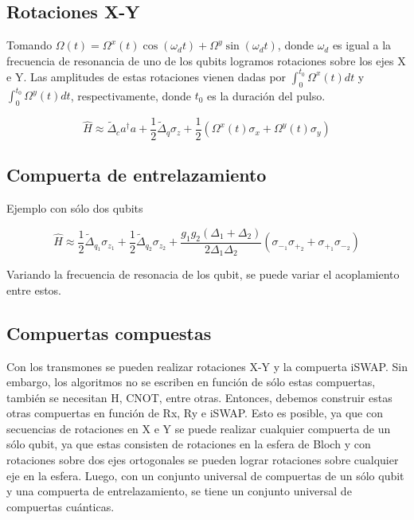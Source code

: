 \subsection{Rotaciones X-Y}

Tomando $\Omega(t) = \Omega^x(t) \cos(\omega_d t) + \Omega^y \sin(\omega_d t)$, donde $\omega_d$ es igual a la frecuencia de resonancia de uno de los qubits logramos rotaciones sobre los ejes X e Y. Las amplitudes de estas rotaciones vienen dadas por $\int_0^{t_0} \Omega^x(t) dt$ y $\int_0^{t_0} \Omega^y(t) dt$, respectivamente, donde $t_0$ es la duración del pulso.

$$\hat{H} \approx \tilde{\Delta}_c a^\dagger a + \frac{1}{2} \tilde{\Delta}_q \sigma_z + \frac{1}{2} (\Omega^x(t) \sigma_x + \Omega^y(t) \sigma_y)$$

\subsection{Compuerta de entrelazamiento}

Ejemplo con sólo dos qubits

$$\hat{H} \approx \frac{1}{2} \tilde{\Delta}_{q_1} \sigma_{z_1} + \frac{1}{2} \tilde{\Delta}_{q_2} \sigma_{z_2} + \frac{g_1 g_2 (\Delta_1 + \Delta_2)}{2 \Delta_1 \Delta_2} (\sigma_{-_1} \sigma_{+_2} + \sigma_{+_1} \sigma_{-_2})$$

Variando la frecuencia de resonacia de los qubit, se puede variar el acoplamiento entre estos. 

\subsection{Compuertas compuestas}

Con los transmones se pueden realizar rotaciones X-Y y la compuerta iSWAP. Sin embargo, los algoritmos no se escriben en función de sólo estas compuertas, también se necesitan H, CNOT, entre otras. Entonces, debemos construir estas otras compuertas en función de Rx, Ry e iSWAP. Esto es posible, ya que con secuencias de rotaciones en X e Y se puede realizar cualquier compuerta de un sólo qubit, ya que estas consisten de rotaciones en la esfera de Bloch y con rotaciones sobre dos ejes ortogonales se pueden lograr rotaciones sobre cualquier eje en la esfera. Luego, con un conjunto universal de compuertas de un sólo qubit y una compuerta de entrelazamiento, se tiene un conjunto universal de compuertas cuánticas.

